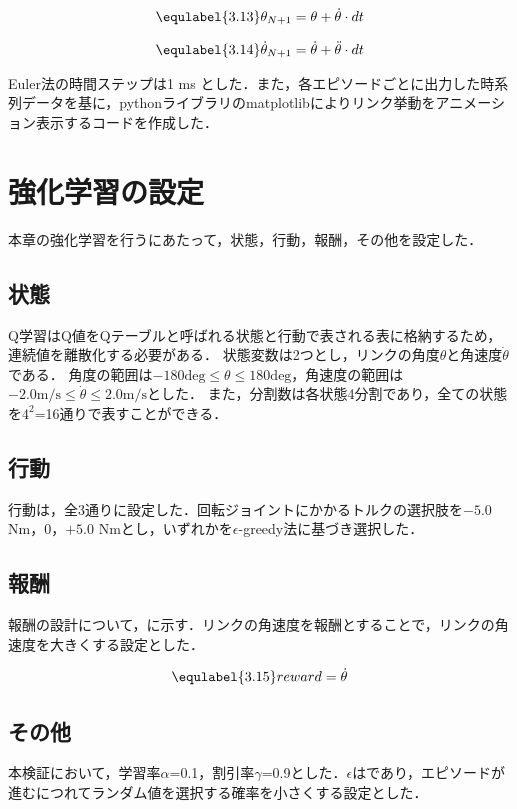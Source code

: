 \begin{eqnarray}
  \equlabel{3.13}
  \theta_{N + 1} = \theta + \dot{\theta} \cdot dt
\end{eqnarray}

\begin{eqnarray}
  \equlabel{3.14}
  \dot{\theta}_{N + 1} = \dot{\theta} + \ddot{\theta} \cdot dt
\end{eqnarray}

Euler法の時間ステップは1 ms とした．また，各エピソードごとに出力した時系列データを基に，pythonライブラリのmatplotlibによりリンク挙動をアニメーション表示するコードを作成した．
\section{強化学習の設定}
本章の強化学習を行うにあたって，状態，行動，報酬，その他を設定した．
\subsection{状態}
Q学習はQ値をQテーブルと呼ばれる状態と行動で表される表に格納するため，連続値を離散化する必要がある．
状態変数は2つとし，リンクの角度$\theta$と角速度$\dot{\theta}$である．
角度の範囲は$-180\mathrm{deg} \leq \theta \leq 180\mathrm{deg}$，角速度の範囲は$-2.0 \mathrm{m/s} \leq \dot{\theta} \leq 2.0 \mathrm{m/s}$とした．
また，分割数は各状態4分割であり，全ての状態を$4^{2}$=16通りで表すことができる．
\subsection{行動}
行動は，全3通りに設定した．回転ジョイントにかかるトルクの選択肢を$-5.0$ Nm，$0$，$+5.0$ Nmとし，いずれかを$\epsilon$-greedy法に基づき選択した．
\subsection{報酬}
報酬の設計について，に示す．リンクの角速度を報酬とすることで，リンクの角速度を大きくする設定とした．

\begin{eqnarray}
  \equlabel{3.15}
  reward = \dot{\theta}
\end{eqnarray}

\subsection{その他}
本検証において，学習率$\alpha$=0.1，割引率$\gamma$=0.9とした．$\epsilon$はであり，エピソードが進むにつれてランダム値を選択する確率を小さくする設定とした．

